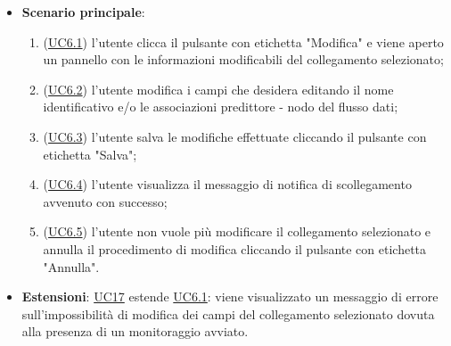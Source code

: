\begin{itemize}
			\item\textbf{Scenario principale}:
				\begin{enumerate}
				
				\item (\hyperref[par:UC6.1]{UC6.1}) l'utente clicca il pulsante con etichetta "Modifica" e viene aperto un pannello con le informazioni modificabili del collegamento selezionato;
				\item (\hyperref[par:UC6.2]{UC6.2}) l'utente modifica i campi che desidera editando il nome identificativo e/o  le associazioni predittore - nodo del flusso dati;
				\item (\hyperref[par:UC6.3]{UC6.3}) l'utente salva le modifiche effettuate cliccando il pulsante con etichetta "Salva";
				\item (\hyperref[par:UC6.4]{UC6.4}) l'utente visualizza il messaggio di notifica di scollegamento avvenuto con successo;
				\item (\hyperref[par:UC6.5]{UC6.5}) l'utente non vuole più modificare il collegamento selezionato e annulla il procedimento di modifica cliccando il pulsante con etichetta "Annulla".			
				\end{enumerate}		
				
				\item\textbf{Estensioni}: \hyperref[par:UC17]{UC17} estende \hyperref[par:UC6.1]{UC6.1}: viene visualizzato un messaggio di errore sull'impossibilità di modifica dei campi del collegamento selezionato dovuta alla presenza di un monitoraggio avviato.
		\end{itemize}

\label{par:UC6.1}
